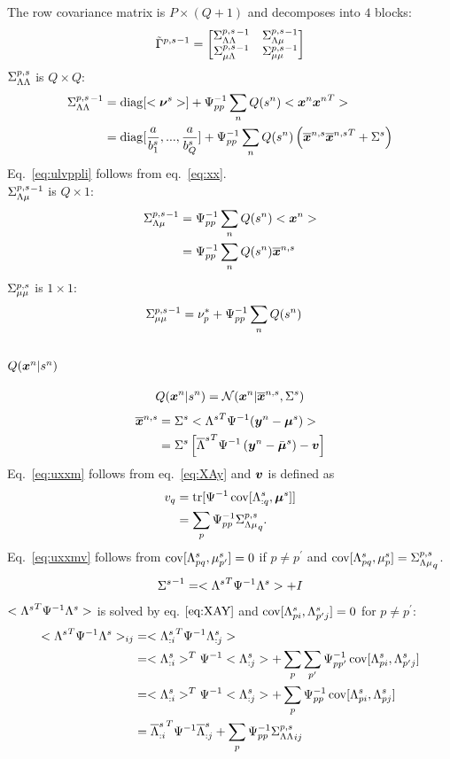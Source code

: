 \documentclass[a4paper]{article}
\begin{document}
The row covariance matrix is $P\times(Q+1)$ and decomposes into $4$ blocks:
\begin{align}
  \Xltvpi=\begin{bmatrix}
    \Xlvplli & \Xlvplui \\
    \Xlvpuli & \Xlvpuui
  \end{bmatrix}
\end{align}
$\Xlvpll$ is $Q\times Q$:
\begin{align}
  \Xlvplli
  &=\Xdiag[<\Xn>]+\Xpsii_{pp}\sum_n Q(\Xs)<\Xx{\Xx}^T> \\
  &=\Xdiag[\frac{a}{b^s_1},...,\frac{a}{b^s_Q}]+\Xpsii_{pp}\sum_n Q(\Xs)\left(\Xxm{\Xxm}^T+\Xxv\right) \label{eq:ulvppli}
\end{align}
Eq.~\ref{eq:ulvppli} follows from eq.~\ref{eq:xx}. \\
$\Xlvplui$ is $Q\times 1$:
\begin{align}
  \Xlvplui
  &=\Xpsii_{pp}\sum_n Q(\Xs)<\Xx> \\
  &=\Xpsii_{pp}\sum_n Q(\Xs)\Xxm
\end{align}
$\Xlvpuu$ is $1\times 1$:
\begin{align}
  \Xlvpuui&=
  \nu^*_p+\Xpsii_{pp}\sum_n Q(\Xs)
\end{align}

\subsection{$Q(\Xx|\Xs)$}
\begin{align}
  Q(\Xx|\Xs)=\mathcal{N}(\Xx|\Xxm,\Xxv)
\end{align}
\begin{align}
  \Xxm
  &=\Xxv<{\Xl}^T\Xpsii(\Xy-\Xu)> \\
  &=\Xxv\left[{\Xlm}^T\Xpsii\left(\Xy-\Xum\right)-\bs{v}\right] \label{eq:uxxm}
\end{align}
Eq.~\ref{eq:uxxm} follows from eq.~\ref{eq:XAy} and $\bs{v}$ is defined as
\begin{align}
  v_q
  &=\Xtr[\Xpsii\Xcov[\Xl_{:q},\Xu]] \\
  &=\sum_p \Xpsii_{pp} {\Xlvplu}_q. \label{eq:uxxmv}
\end{align}
Eq.~\ref{eq:uxxmv} follows from $\Xcov[\Xl_{pq},\mu^s_{p^\prime}]=0$ if $p\neq p^\prime$ and $\Xcov[\Xl_{pq},\mu^s_{p}]={\Xlvplu}_q$.
\begin{align}
  {\Xxv}^{-1}=<{\Xl}^T \Xpsii \Xl>+I
\end{align}
$<{\Xl}^T \Xpsii \Xl>$ is solved by eq. $\ref{eq:XAY}$ and $\Xcov[\Xl_{pi},\Xl_{p^\prime j}]=0$ for $p\ne p^\prime$:
\begin{align}
  <{\Xl}^T \Xpsii \Xl>_{ij}&=<{\Xl_{:i}}^T \Xpsii \Xl_{:j}> \\
  &=<\Xl_{:i}>^T\Xpsii <\Xl_{:j}>+\sum_p\sum_{p^\prime} \Xpsii_{pp^\prime}\Xcov[\Xl_{pi},\Xl_{p^\prime j}] \\
  &=<\Xl_{:i}>^T\Xpsii <\Xl_{:j}>+\sum_p \Xpsii_{pp}\Xcov[\Xl_{pi},\Xl_{pj}] \\
  &={\Xlm_{:i}}^T\Xpsii \Xlm_{:j}+\sum_p \Xpsii_{pp}{\Xlvpll}_{ij}
\end{align}
\end{document}
